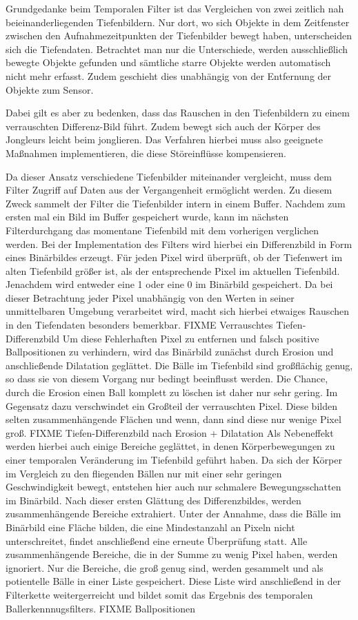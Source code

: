 \documentclass[12pt,a4paper,ngerman]{scrartcl}
\begin{document}
Grundgedanke beim Temporalen Filter ist das Vergleichen von zwei zeitlich nah beieinanderliegenden Tiefenbildern.
Nur dort, wo sich Objekte in dem Zeitfenster zwischen den Aufnahmezeitpunkten der Tiefenbilder bewegt haben,
unterscheiden sich die Tiefendaten. Betrachtet man nur die Unterschiede, werden ausschließlich bewegte Objekte gefunden und sämtliche starre Objekte werden automatisch nicht mehr erfasst.
Zudem geschieht dies unabhängig von der Entfernung der Objekte zum Sensor.

Dabei gilt es aber zu bedenken, dass das Rauschen in den Tiefenbildern zu einem verrauschten Differenz-Bild führt. Zudem bewegt sich auch der Körper des Jongleurs leicht beim jonglieren. Das Verfahren hierbei muss also geeignete Maßnahmen implementieren, die diese Störeinflüsse kompensieren.

Da dieser Ansatz verschiedene Tiefenbilder miteinander vergleicht, muss dem Filter Zugriff auf Daten aus der Vergangenheit ermöglicht werden.
Zu diesem Zweck sammelt der Filter die Tiefenbilder intern in einem Buffer.
Nachdem zum ersten mal ein Bild im Buffer gespeichert wurde, kann im nächsten Filterdurchgang das momentane Tiefenbild mit dem vorherigen verglichen werden.
Bei der Implementation des Filters wird hierbei ein Differenzbild in Form eines Binärbildes erzeugt.
Für jeden Pixel wird überprüft, ob der Tiefenwert im alten Tiefenbild größer ist, als der entsprechende Pixel im aktuellen Tiefenbild.
Jenachdem wird entweder eine 1 oder eine 0 im Binärbild gespeichert.
Da bei dieser Betrachtung jeder Pixel unabhängig von den Werten in seiner unmittelbaren Umgebung verarbeitet wird, macht sich hierbei etwaiges Rauschen in den Tiefendaten besonders bemerkbar.
{\color{red}FIXME Verrauschtes Tiefen-Differenzbild}
Um diese Fehlerhaften Pixel zu entfernen und falsch positive Ballpositionen zu verhindern, wird das Binärbild zunächst durch Erosion und anschließende Dilatation geglättet.
Die Bälle im Tiefenbild sind großflächig genug, so dass sie von diesem Vorgang nur bedingt beeinflusst werden.
Die Chance, durch die Erosion einen Ball komplett zu löschen ist daher nur sehr gering.
Im Gegensatz dazu verschwindet ein Großteil der verrauschten Pixel.
Diese bilden selten zusammenhängende Flächen und wenn, dann sind diese nur wenige Pixel groß.
{\color{red}FIXME Tiefen-Differenzbild nach Erosion + Dilatation}
Als Nebeneffekt werden hierbei auch einige Bereiche geglättet, in denen Körperbewegungen zu einer temporalen Veränderung im Tiefenbild geführt haben. Da sich der Körper im Vergleich zu den fliegenden Bällen nur mit einer sehr geringen Geschwindigkeit bewegt, entstehen hier auch nur schmalere Bewegungsschatten im Binärbild.
Nach dieser ersten Glättung des Differenzbildes, werden zusammenhängende Bereiche extrahiert.
Unter der Annahme, dass die Bälle im Binärbild eine Fläche bilden, die eine Mindestanzahl an Pixeln nicht unterschreitet, findet anschließend eine erneute Überprüfung statt. Alle zusammenhängende Bereiche, die in der Summe zu wenig Pixel haben, werden ignoriert.
Nur die Bereiche, die groß genug sind, werden gesammelt und als potientelle Bälle in einer Liste gespeichert.
Diese Liste wird anschließend in der Filterkette weitergerreicht und bildet somit das Ergebnis des temporalen Ballerkennnugsfilters.
{\color{red}FIXME Ballpositionen}
\end{document}
